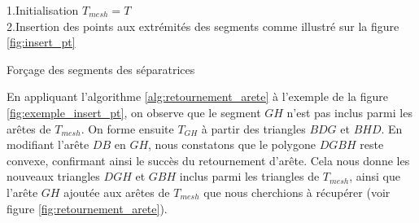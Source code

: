 \vspace{0.5cm}
\begin{algorithm}[h!]
\renewcommand{\algorithmcfname}{Algorithme}%
\SetAlgoLined
{}
\vspace{0.2cm}
1.\quad Initialisation $T_{mesh}=T$\\[0.2cm]
2.\quad Insertion des points aux extrémités des segments comme illustré sur la figure \ref{fig:insert_pt}\\[0.2cm]
\caption{Forçage des segments des séparatrices}
\label{alg:retournement_arete}
\end{algorithm}
\vspace{0.5cm}

En appliquant l'algorithme \ref{alg:retournement_arete} à l'exemple de la figure \ref{fig:exemple_insert_pt}, on observe que le segment $GH$ n'est pas inclus parmi les arêtes de $T_{mesh}$. On forme ensuite $T_{GH}$ à partir des triangles $BDG$ et $BHD$. En modifiant l'arête $DB$ en $GH$, nous constatons que le polygone $DGBH$ reste convexe, confirmant ainsi le succès du retournement d'arête. Cela nous donne les nouveaux triangles $DGH$ et $GBH$ inclus parmi les triangles de $T_{mesh}$, ainsi que l'arête $GH$ ajoutée aux arêtes de $T_{mesh}$ que nous cherchions à récupérer (voir figure \ref{fig:retournement_arete}).

